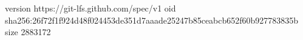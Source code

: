 version https://git-lfs.github.com/spec/v1
oid sha256:26f72f1f924d48f024453de351d7aaade25247b85ceabcb652f60b927783835b
size 2883172
